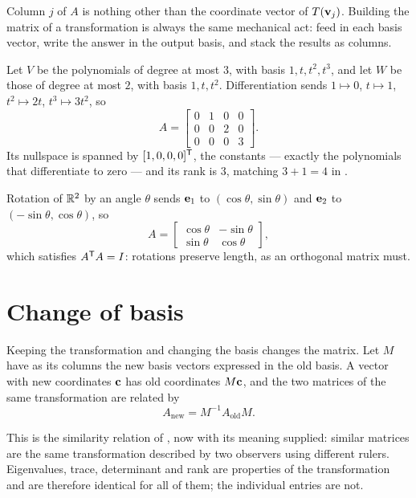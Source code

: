 \begin{remark}
Column \(j\) of \(A\) is nothing other than the coordinate vector of
\(T(\mathbf{v}_j)\). Building the matrix of a transformation is always the same
mechanical act: feed in each basis vector, write the answer in the output basis,
and stack the results as columns.
\end{remark}

\begin{example}
Let \(V\) be the polynomials of degree at most \(3\), with basis
\(1,t,t^{2},t^{3}\), and let \(W\) be those of degree at most \(2\), with basis
\(1,t,t^{2}\). Differentiation sends \(1\mapsto0\), \(t\mapsto1\),
\(t^{2}\mapsto2t\), \(t^{3}\mapsto3t^{2}\), so
\[
	A=\begin{bmatrix}0&1&0&0\\0&0&2&0\\0&0&0&3\end{bmatrix}.
\]
Its nullspace is spanned by \([1,0,0,0]^{\mathsf{T}}\), the constants --- exactly the
polynomials that differentiate to zero --- and its rank is \(3\), matching
\(3+1=4\) in .
\end{example}

\begin{example}
Rotation of \(\mathbb{R}^{2}\) by an angle \(\theta\) sends \(\mathbf{e}_1\) to
\((\cos\theta,\sin\theta)\) and \(\mathbf{e}_2\) to \((-\sin\theta,\cos\theta)\), so
\[
	A=\begin{bmatrix}\cos\theta&-\sin\theta\\ \sin\theta&\cos\theta\end{bmatrix},
\]
which satisfies \(A^{\mathsf{T}} A=I\): rotations preserve length, as an orthogonal matrix
must.
\end{example}

\section{Change of basis}

Keeping the transformation and changing the basis changes the matrix. Let \(M\)
have as its columns the new basis vectors expressed in the old basis. A vector
with new coordinates \(\mathbf{c}\) has old coordinates \(M\mathbf{c}\), and the two
matrices of the same transformation are related by
\[
	A_{\text{new}}=M^{-1}A_{\text{old}}M .
\]

This is the similarity relation of , now with its meaning
supplied: similar matrices are the same transformation described by two
observers using different rulers. Eigenvalues, trace, determinant and rank are
properties of the transformation and are therefore identical for all of them;
the individual entries are not.

